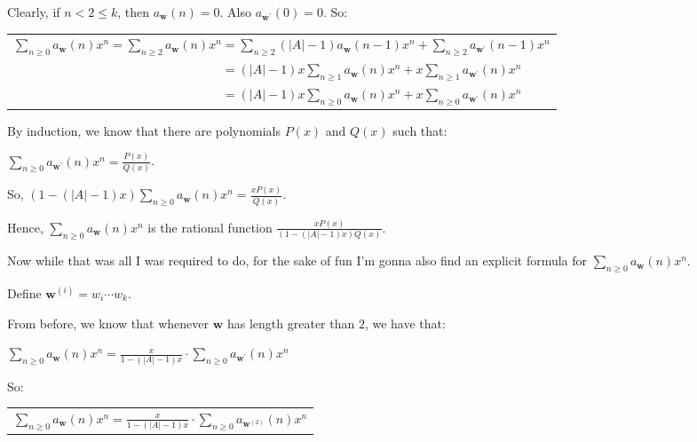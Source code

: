 \documentclass{book}
\newenvironment{myIndent}{%
   \begin{adjustwidth}{2.5em}{0em}%
}{%
   \end{adjustwidth}%
}
\newcommand{\retTwo}{\hfill\bigbreak}
\begin{document}
\begin{myIndent}
   Clearly, if $n < 2 \leq k$, then $a_{\bm{w}}(n) = 0$. Also $a_{\bm{w}^\prime}(0) = 0$. So:\\ [-8pt]
   
   {\center
   \begin{tabular}{l}
      $\sum\limits_{n \geq 0}a_{\bm{w}}(n)x^n = \sum\limits_{n \geq 2}a_{\bm{w}}(n)x^n = \sum\limits_{n \geq 2}(|A| - 1)a_{\bm{w}}(n - 1)x^n + \sum\limits_{n \geq 2}a_{\bm{w}^\prime}(n-1)x^n$\\ [18pt]

      $\phantom{\sum\limits_{n \geq 0}a_{\bm{w}}(n)x^n = \sum\limits_{n \geq 2}a_{\bm{w}}(n)x^n} = (|A| - 1)x\sum\limits_{n \geq 1}a_{\bm{w}}(n)x^n + x\sum\limits_{n \geq 1}a_{\bm{w}^\prime}(n)x^n$\\ [18pt]

      $\phantom{\sum\limits_{n \geq 0}a_{\bm{w}}(n)x^n = \sum\limits_{n \geq 2}a_{\bm{w}}(n)x^n} = (|A| - 1)x\sum\limits_{n \geq 0}a_{\bm{w}}(n)x^n + x\sum\limits_{n \geq 0}a_{\bm{w}^\prime}(n)x^n$
   \end{tabular}\retTwo\par}

   By induction, we know that there are polynomials $P(x)$ and $Q(x)$ such that:
   
   {\centering $\sum\limits_{n \geq 0}a_{\bm{w}^\prime}(n)x^n = \frac{P(x)}{Q(x)}$.\retTwo\par}

   So, $(1 - (|A| - 1)x)\sum\limits_{n \geq 0}a_{\bm{w}}(n)x^n = \frac{xP(x)}{Q(x)}$.\newpage
   
   Hence, $\sum\limits_{n \geq 0}a_{\bm{w}}(n)x^n$ is the rational function $\frac{xP(x)}{(1 - (|A| - 1)x)Q(x)}$.\retTwo
   
   Now while that was all I was required to do, for the sake of fun I'm gonna also find an explicit formula for $\sum\limits_{n \geq 0}a_{\bm{w}}(n)x^n$.\retTwo

   Define $\bm{w}^{(i)} = w_i \cdots w_k$.\retTwo

   From before, we know that whenever $\bm{w}$ has length greater than $2$, we have that:
   
   {\centering $\sum\limits_{n \geq 0}a_{\bm{w}}(n)x^n = \frac{x}{1 - (|A| - 1)x} \cdot \sum\limits_{n \geq 0}a_{\bm{w}^\prime}(n)x^n$ \retTwo\par}

   So:\\ [-10pt]

   {\centering  
   \begin{tabular}{l}
      $\sum\limits_{n \geq 0}a_{\bm{w}}(n)x^n = \frac{x}{1 - (|A| - 1)x} \cdot \sum\limits_{n \geq 0}a_{\bm{w}^{(2)}}(n)x^n$\\ [18pt]
      

\end{tabular}}
\end{myIndent}
\end{document}
